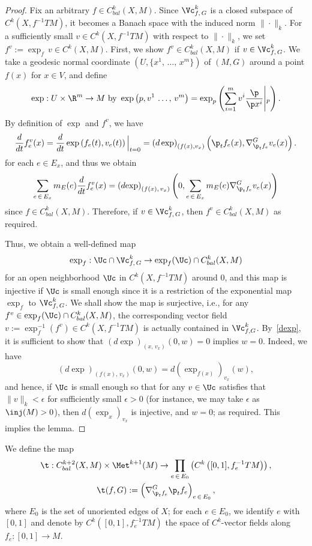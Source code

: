 \begin{proof}
Fix an arbitrary $f\in C^k_{bal}(X, M)$. Since $\Vc_{f,\,G}^k$ is a closed subspace of $C^k(X, f^{-1}TM)$, it becomes a Banach space with the induced norm $\|\cdot\|_k$. For a sufficiently small $v\in C^k(X, f^{-1}TM)$ with respect to $\|\cdot\|_k$, we set $f^v:=\exp_f\, v\in C^k(X, M)$. First, we show $f^v\in C^k_{bal}(X, M)$ if $v\in \Vc_{f,\,G}^k$. We take a geodesic normal coordinate $(U,\{x^1,\,\ldots,\,x^m\})$ of $(M,G)$ around a point $f(x)$ for $x\in V$, and define
\[
\exp: U\times \R^m\to M\text{ by } \exp\left(p, v^1\,\ldots,\,v^m\right)=\exp_{p}\left(\sum_{i=1}^mv^i\frac{\p}{\p x^i}\middle|_{p}\right).
\]
By definition of $\exp$ and $f^v$, we have
\[
\frac{d}{d t} {f}^v_e(x)=\frac{d}{dt} \exp\left(f_e(t), v_e(t)\right)\Big|_{t=0}=\left(d\exp\right)_{\left(f(x), v_x\right)}\left(\p_t f_e(x), \nabla^G_{\p_t{f}_e}v_e(x)\right).
\]
for each $e\in E_x$, and thus we obtain
\begin{equation}\label{dexp}
\sum_{e\,\in\,E_x}m_E(e)\frac{d}{d t} f^v_e(x)=\left(d{\exp}\right)_{\left(f(x), \,v_x\right)}\left(0, \sum_{e\,\in\,E_x}m_E(e)\nabla^G_{\p_t{f}_e}v_e(x)\right)
\end{equation}
since $f\in C^k_{bal}(X, M)$. Therefore, if $v\in \Vc_{f,\,G}^k$, then $f^v\in C^k_{bal}(X, M)$ as required.

Thus, we obtain a well-defined map
\[
\exp_f: \Uc\cap \Vc_{f,\,G}^k\to \exp_f(\Uc)\cap C^k_{bal}(X,M)
\]
for an open neighborhood $\Uc$ in $C^k(X, f^{-1}TM)$ around $0$, and this map is injective if $\Uc$ is small enough since it is a restriction of the exponential map $\exp_f$ to $\Vc_{f,\,G}^k$. We shall show the map is surjective, i.e., for any $f^v\in \exp_f(\Uc)\cap C^k_{bal}(X, M)$, the corresponding vector field $v:=\exp^{-1}_f(f^v)\in C^k(X, f^{-1}TM)$ is actually contained in $\Vc_{f, G}^k$. By~\eqref{dexp}, it is sufficient to show that $(d\exp)_{(x,\,v_x)}(0,w)=0$ implies $w=0$. Indeed, we have
\[
(d\exp)_{\left(f(x),\,v_x\right)}(0,w)=d\left(\exp_{f(x)}\right)_{v_x}(w),
\]
and hence, if $\Uc$ is small enough so that for any $v \in \Uc$ satisfies that $\|v\|_k<\epsilon$ for sufficiently small $\epsilon>0$ (for instance, we may take $\epsilon$ as ${\inj}(M)>0$), then $d({\exp}_x)_{v_x}$ is injective, and $w=0$; as required. This implies the lemma.
\end{proof}


We define the map
\begin{gather*}
\t: C_{bal}^{k+2}(X, M) \times \Met^{k+1}(M) \to \prod_{e\,\in\,E_0}\left(C^k\left([0, 1], f_e^{-1}TM\right)\right),
\\
\t(f, G):=\left(\nabla_{\p_t f_e}^G \p_t f_e\right)_{e\,\in\,E_0},
\end{gather*}
where $E_0$ is the set of unoriented edges of $X$; for each $e \in E_0$, we identify $e$ with $[0, 1]$ and denote by $C^k([0, 1], f_e^{-1}TM)$ the space of $C^k$-vector fields along $f_e:[0, 1] \to M$.

